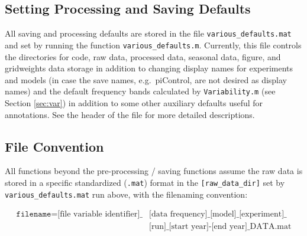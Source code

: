 \documentclass{article}
\begin{document}
\subsection{Setting Processing and Saving Defaults}
All saving and processing defaults are stored in the file \texttt{various\_defaults.mat} and set by running the function \texttt{various\_defaults.m}. Currently, this file controls the directories for code, raw data, processed data, seasonal data, figure, and gridweights data storage in addition to changing display names for experiments and models (in case the save names, e.g.\ piControl, are not desired as display names) and the default frequency bands calculated by \texttt{Variability.m} (see Section \ref{sec:var}) in addition to some other auxiliary defaults useful for annotations. See the header of the file for more detailed descriptions. 

\subsection{File Convention}
All functions beyond the pre-processing / saving functions assume the raw data is stored in a specific standardized (\texttt{.mat}) format in the \texttt{[raw\_data\_dir]} set by \texttt{various\_defaults.mat} run above, with the filenaming convention: 

\begin{equation}
\begin{split}
\texttt{filename} = \text{[file variable identifier]\_}&\text{[data frequency]\_[model]\_[experiment]\_}\\
&\text{[run]\_[start year]-[end year]\_DATA.mat}
\end{split}
\end{equation}
\end{document}
